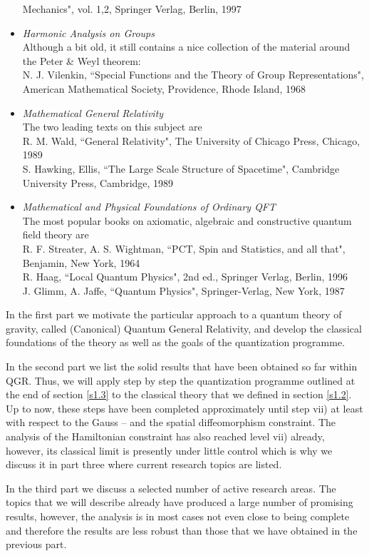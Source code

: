 \documentclass[12pt]{report}
\begin{document}
\begin{itemize}
Mechanics", vol. 1,2, Springer Verlag, Berlin, 1997
%
\item {\it Harmonic Analysis on Groups}\\
Although a bit old, it still contains a nice collection of the material
around the Peter \& Weyl theorem:\\
N. J. Vilenkin, ``Special Functions and the Theory of Group
Representations", American Mathematical Society, Providence, Rhode
Island, 1968
%
\item {\it Mathematical General Relativity}\\
The two leading texts on this subject are \\
R. M. Wald, ``General Relativity", The University of Chicago
Press, Chicago, 1989\\
S. Hawking, Ellis, ``The Large Scale Structure of Spacetime",
Cambridge University Press, Cambridge, 1989
%
\item {\it Mathematical and Physical Foundations of Ordinary QFT}\\
The most popular books on axiomatic, algebraic and constructive quantum
field theory are \\
R. F. Streater, A. S. Wightman, ``PCT, Spin and Statistics, and
all that", Benjamin, New York, 1964\\
R. Haag, ``Local Quantum Physics", 2nd ed., Springer Verlag,
Berlin, 1996\\
J. Glimm, A. Jaffe, ``Quantum Physics", Springer-Verlag, New York, 1987
%
\end{itemize}
%
In the first part we motivate the particular approach to a quantum theory
of gravity, called (Canonical) Quantum General Relativity, and develop the 
classical
foundations of the theory as well as the goals of the quantization programme.

In the second part we list the solid results that have been obtained so 
far within QGR. Thus, we will apply step by step the quantization 
programme outlined at the end of section \ref{s1.3} to the classical 
theory that we defined in section \ref{s1.2}. Up to now, these steps have 
been completed approximately until step vii) at least with respect to 
the Gauss -- and the spatial diffeomorphism constraint. The analysis
of the Hamiltonian constraint has also reached level vii) already, however,
its classical limit is presently under little control which is why we 
discuss it in part three where current research topics are listed.

In the third part we discuss a selected number of active research 
areas.
The topics that we will describe already have produced a large number of 
promising results, however, the analysis is in most cases not even close 
to being complete and therefore the results are less robust than those 
that we have obtained in the previous part.
\end{document}
